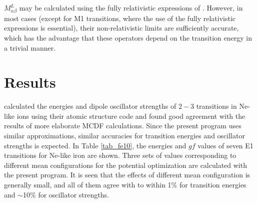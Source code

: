 \documentclass[preprint, floatfix, pra, showpacs, showkeys]{revtex4}
\begin{document}
$M^L_{\alpha\beta}$ may be calculated using the fully relativistic
expressions of \textcite{grant74}. However, in most cases (except for M1
transitions, where the use of the fully relativistic expressions is
essential), their non-relativistic 
limits are sufficiently accurate, which has the advantage that these operators
depend on the transition energy in a trivial manner. 

\section{Results}
\label{sec_results}
\textcite{sampson89} calculated the energies and dipole oscillator strengths
of $2-3$ transitions in Ne-like ions using their atomic structure code and
found good agreement with the results of more elaborate MCDF
calculations. Since the present program uses similar approximations, similar
accuracies for transition energies and oscillator strengths is expected. In
Table \ref{tab_fe10}, the energies and $gf$ values of seven E1 transitions for
Ne-like iron are shown. Three sets of values corresponding to different mean
configurations 
for the potential optimization are calculated with the present program. It is
seen that the effects of different mean configuration is generally small, and
all of them agree with \textcite{sampson89} to within 1\% for transition
energies and $\sim$10\% for oscillator strengths. 
\end{document}
